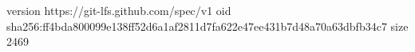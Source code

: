 version https://git-lfs.github.com/spec/v1
oid sha256:ff4bda800099e138ff52d6a1af2811d7fa622e47ee431b7d48a70a63dbfb34c7
size 2469
